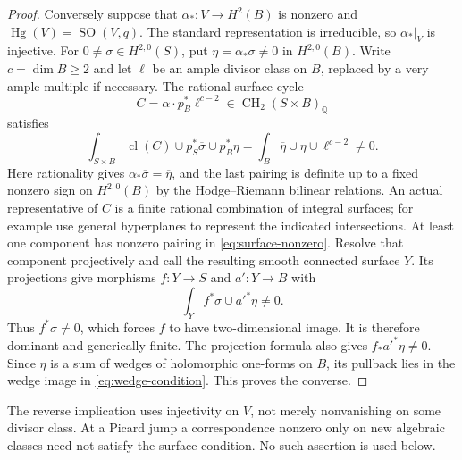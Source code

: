 \begin{proof}
Conversely suppose that $\alpha_*:V\to H^2(B)$ is nonzero and $\operatorname{Hg}(V)=\operatorname{SO}(V,q)$. The standard representation is irreducible, so $\alpha_*|_V$ is injective. For $0\ne\sigma\in H^{2,0}(S)$, put $\eta=\alpha_*\sigma\ne0$ in $H^{2,0}(B)$. Write $c=\dim B\ge2$ and let $\ell$ be an ample divisor class on $B$, replaced by a very ample multiple if necessary. The rational surface cycle
\[
 C=\alpha\cdot p_B^*\ell^{c-2}\in\operatorname{CH}_2(S\times B)_{\mathbb Q}
\]
satisfies
\begin{equation}\label{eq:surface-nonzero}
 \int_{S\times B}\operatorname{cl}(C)\cup p_S^*\overline\sigma\cup p_B^*\eta
 =\int_B\overline\eta\cup\eta\cup\ell^{c-2}\ne0.
\end{equation}
Here rationality gives $\alpha_*\overline\sigma=\overline\eta$, and the last pairing is definite up to a fixed nonzero sign on $H^{2,0}(B)$ by the Hodge--Riemann bilinear relations. An actual representative of $C$ is a finite rational combination of integral surfaces; for example use general hyperplanes to represent the indicated intersections. At least one component has nonzero pairing in \eqref{eq:surface-nonzero}. Resolve that component projectively and call the resulting smooth connected surface $Y$. Its projections give morphisms $f:Y\to S$ and $a':Y\to B$ with
\[
 \int_Y f^*\overline\sigma\cup a'^*\eta\ne0.
\]
Thus $f^*\sigma\ne0$, which forces $f$ to have two-dimensional image. It is therefore dominant and generically finite. The projection formula also gives $f_*a'^*\eta\ne0$. Since $\eta$ is a sum of wedges of holomorphic one-forms on $B$, its pullback lies in the wedge image in \eqref{eq:wedge-condition}. This proves the converse.
\end{proof}

\begin{remark}
The reverse implication uses injectivity on $V$, not merely nonvanishing on some divisor class. At a Picard jump a correspondence nonzero only on new algebraic classes need not satisfy the surface condition. No such assertion is used below.
\end{remark}
